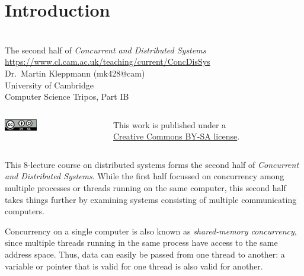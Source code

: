 \section{Introduction}\label{sec:introduction}

\begin{frame}
    \label{s:title}
    \begin{center}
        \textbf{\huge{\color{darkblue}{Distributed Systems}}} \\[2em]
        The second half of \emph{Concurrent and Distributed Systems}\\[0.5em]
        \url{https://www.cl.cam.ac.uk/teaching/current/ConcDisSys}\\[2em]
        Dr.\ Martin Kleppmann (mk428@cam) \\[0.5em]
        University of Cambridge \\[0.5em]
        Computer Science Tripos, Part IB \\[2em]
    \end{center}
    \begin{columns}[totalwidth=9cm]
        \begin{column}{4cm}
            \hfill\includegraphics[height=0.5cm]{images/creative-commons.png}\hspace{5pt}
        \end{column}
        \begin{column}{5cm}\scriptsize
            This work is published under a\\\href{https://creativecommons.org/licenses/by-sa/4.0/}{Creative Commons BY-SA license}.
        \end{column}
    \end{columns}
\end{frame}

This 8-lecture course on distributed systems forms the second half of \emph{Concurrent and Distributed Systems}.
While the first half focussed on concurrency among multiple processes or threads running on the same computer, this second half takes things further by examining systems consisting of multiple communicating computers.

Concurrency on a single computer is also known as \emph{shared-memory concurrency}, since multiple threads running in the same process have access to the same address space.
Thus, data can easily be passed from one thread to another: a variable or pointer that is valid for one thread is also valid for another.

